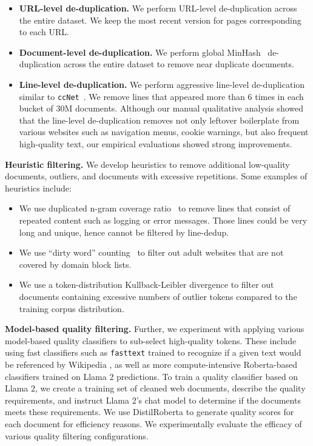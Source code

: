 \begin{itemize}
\item \textbf{URL-level de-duplication.}
We perform URL-level de-duplication across the entire dataset. We keep the most recent version for pages corresponding to each URL.

\item \textbf{Document-level de-duplication.}
We perform global MinHash~\citep{666900} de-duplication across the entire dataset to remove near duplicate documents.

\item \textbf{Line-level de-duplication.}
We perform aggressive line-level de-duplication similar to \texttt{ccNet}~\citep{wenzek2019ccnetextractinghighquality}.
We remove lines that appeared more than 6 times in each bucket of 30M documents. 
Although our manual qualitative analysis showed that the line-level de-duplication removes not only leftover boilerplate from various websites such as navigation menus, cookie warnings, but also frequent high-quality text, our empirical evaluations showed strong improvements.

\end{itemize}

\textbf{Heuristic filtering.}
We develop heuristics to remove additional low-quality documents, outliers, and documents with excessive repetitions. Some examples of heuristics include:
\begin{itemize}
\item We use duplicated n-gram coverage ratio~\citep{Rae2021ScalingLM} to remove lines that consist of repeated content such as logging or error messages. Those lines could be very long and unique, hence cannot be filtered by line-dedup. 
\item We use ``dirty word'' counting~\citep{raffel2020exploring} to filter out adult websites that are not covered by domain block lists.
\item We use a token-distribution Kullback-Leibler divergence to filter out documents containing excessive numbers of outlier tokens compared to the training corpus distribution.
\end{itemize}

\textbf{Model-based quality filtering.}
Further, we experiment with applying various model-based quality classifiers to sub-select high-quality tokens. These include using fast classifiers such as \texttt{fasttext} \citep{joulin2017bag} trained to recognize if a given text would be referenced by Wikipedia \citep{touvron2023llama}, as well as more compute-intensive Roberta-based classifiers \citep{liu2019roberta} trained on Llama 2 predictions.
To train a quality classifier based on Llama 2, we create a training set of cleaned web documents, describe the quality requirements, and instruct Llama 2's chat model to determine if the documents meets these requirements. 
We use DistilRoberta \citep{sanh2019distilbert} to generate quality scores for each document for efficiency reasons.
We experimentally evaluate the efficacy of various quality filtering configurations.

